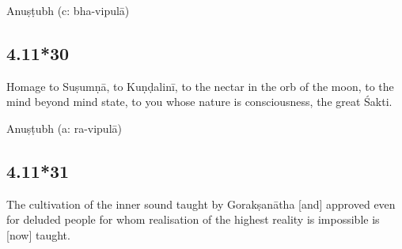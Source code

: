 \begin{ekdosis}


\begin{metre}[hp04_011_29]
Anuṣṭubh (c: bha-vipulā)
\end{metre}



\subsection*{4.11*30}
\begin{translation}[hp04_011_30]
Homage to Suṣumṇā, to Kuṇḍalinī, to the nectar in the orb of the moon, to the mind beyond mind state, to you whose nature is consciousness, the great Śakti.%
\end{translation}




\begin{metre}[hp04_011_30]
Anuṣṭubh (a: ra-vipulā)
\end{metre}

\subsection*{4.11*31}
\begin{translation}[hp04_011_31]
The cultivation of the inner sound taught by Gorakṣanātha [and] approved even for deluded people for whom realisation of the highest reality is impossible is [now] taught.
\end{translation} %


\end{ekdosis}
